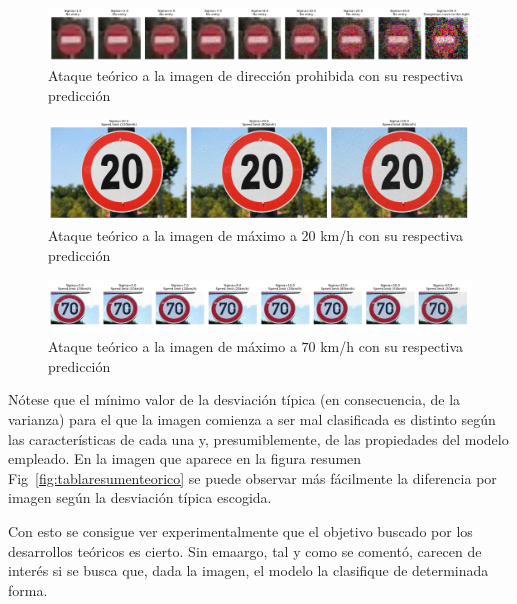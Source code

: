 \begin{figure}[H]
    \centering
        \centering
        \includegraphics[width=\textwidth]{img/dir_prohib_teorico.png}
        \caption{Ataque teórico a la imagen de dirección prohibida con su respectiva predicción}
        \label{fig:dir_prob_teorico}
\end{figure}

\begin{figure}[H]
    \centering
        \centering
        \includegraphics[width=\textwidth]{img/max_20_teorico.png}
        \caption{Ataque teórico a la imagen de máximo a $20$ km/h con su respectiva predicción}
        \label{fig:max20teorico}
\end{figure}

\begin{figure}[H]
    \centering
        \centering
        \includegraphics[width=\textwidth]{img/max_70_teorico.png}
        \caption{Ataque teórico a la imagen de máximo a $70$ km/h con su respectiva predicción}
        \label{fig:max70teorico}
\end{figure}

Nótese que el mínimo valor de la desviación típica (en consecuencia, de la varianza) para el que la imagen comienza a ser mal clasificada es distinto según las características de cada una y, presumiblemente, de las propiedades del modelo empleado. En la imagen que aparece en la figura resumen Fig~\ref{fig:tablaresumenteorico} se puede observar más fácilmente la diferencia por imagen según la desviación típica escogida.

Con esto se consigue ver experimentalmente que el objetivo buscado por los desarrollos teóricos es cierto. Sin emaargo, tal y como se comentó, carecen de interés si se busca que, dada la imagen, el modelo la clasifique de determinada forma.

